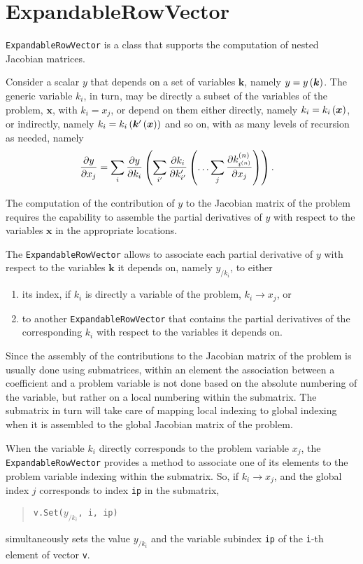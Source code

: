 \documentclass[10pt,dvips,fleqn,subeqn]{report}
\newcommand{\T}[1]{\bm{#1}}
\begin{document}
\section{ExpandableRowVector}
\texttt{ExpandableRowVector} is a class that supports
the computation of nested Jacobian matrices.

Consider a scalar $y$  that depends on a set of variables $\T{k}$,
namely $y=y\plbr{\T{k}}$.
The generic variable $k_i$, in turn, may be directly a subset of the variables
of the problem, $\T{x}$, with $k_i=x_j$, or depend on them either directly,
namely $k_i=k_i\plbr{\T{x}}$, or indirectly,
namely $k_i=k_i\plbr{\T{k}'\plbr{\T{x}}}$ and so on,
with as many levels of recursion as needed, namely
\begin{align}
	\frac{\partial y}{\partial x_j}
	&=
	\sum_{i} \frac{\partial y}{\partial k_i}\left( 
		\sum_{i'} \frac{\partial k_i}{\partial k'_{i'}}\left( 
			\ldots
			\sum_{j} \frac{\partial k^{(n)}_{i^{(n)}}}{\partial x_j}
		 \right)
	 \right)
	.
\end{align}

The computation of the contribution of $y$ to the Jacobian matrix
of the problem requires the capability to assemble the partial derivatives
of $y$ with respect to the variables $\T{x}$ in the appropriate locations.

The \texttt{ExpandableRowVector} allows to associate each partial derivative
of $y$ with respect to the variables $\T{k}$ it depends on, namely $y_{/k_i}$,
to either 
\begin{enumerate}
\renewcommand{\labelenumi}{\alph{enumi})}
\item its index, if $k_i$ is directly a variable of the problem,
$k_i\rightarrow x_j$, or
\item to another \texttt{ExpandableRowVector} that contains
the partial derivatives of the corresponding $k_i$ with respect
to the variables it depends on.
\end{enumerate}

Since the assembly of the contributions to the Jacobian matrix of the problem
is usually done using submatrices, within an element the association between
a coefficient and a problem variable is not done based on the absolute numbering
of the variable, but rather on a local numbering within the submatrix.
The submatrix in turn will take care of mapping local indexing to global indexing
when it is assembled to the global Jacobian matrix of the problem.

When the variable $k_i$ directly corresponds to the problem variable $x_j$,
the \texttt{ExpandableRowVector} provides a method to associate
one of its elements to the problem variable indexing within the submatrix.
So, if $k_i\rightarrow x_j$, and the global index $j$ corresponds
to index \texttt{ip} in the submatrix,
\begin{quote}
\texttt{v.Set($y_{/k_i}$, i, ip)}
\end{quote}
simultaneously sets the value $y_{/k_i}$
and the variable subindex \texttt{ip}
of the \texttt{i}-th element of vector \texttt{v}.
\end{document}
